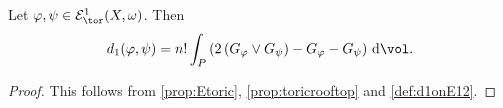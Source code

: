 \begin{corollary}\label{cor:toricd1}
    Let $\varphi,\psi\in \mathcal{E}^1_{\tor}(X,\omega)$. Then
    \[
        d_1(\varphi,\psi)= n!\int_P \left( 2\left(G_{\varphi}\lor G_{\psi}\right)-G_{\varphi}-G_{\psi}\right)\,\mathrm{d}\vol.
    \]
\end{corollary}
\begin{proof}
    This follows from \cref{prop:Etoric}, \cref{prop:toricrooftop} and \cref{def:d1onE12}.
\end{proof}

